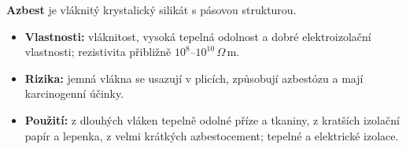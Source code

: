 \textbf{Azbest} je vláknitý krystalický silikát s pásovou strukturou.
\begin{itemize}
\item \textbf{Vlastnosti:} vláknitost, vysoká tepelná odolnost a dobré elektroizolační vlastnosti; rezistivita přibližně $10^8$--$10^{10}\,\Omega\,\mathrm m$.
\item \textbf{Rizika:} jemná vlákna se usazují v plicích, způsobují azbestózu a mají karcinogenní účinky.
\item \textbf{Použití:} z dlouhých vláken tepelně odolné příze a tkaniny, z kratších izolační papír a lepenka, z velmi krátkých azbestocement; tepelné a elektrické izolace.
\end{itemize}

